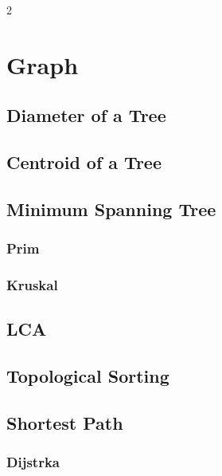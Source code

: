 \documentclass[10pt,a4paper]{article}
\begin{document}
\clearpage
{}
\begin{multicols}{2}

\section{Graph}

\subsection{Diameter of a Tree}


\subsection{Centroid of a Tree}


\subsection{Minimum Spanning Tree}

\subsubsection{Prim}


\subsubsection{Kruskal}


\subsection{LCA}


\subsection{Topological Sorting}


\subsection{Shortest Path}

\subsubsection{Dijstrka}



\end{multicols}
\end{document}
